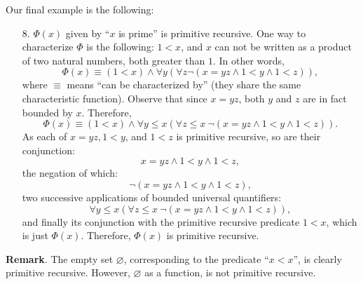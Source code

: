 \documentclass[12pt]{article}
\begin{document}
Our final example is the following:
\begin{enumerate}
\item[8.] $\Phi(x)$ given by ``$x$ is prime'' is primitive recursive.  One way to characterize $\Phi$ is the following: $1<x$, and $x$ can not be written as a product of two natural numbers, both greater than $1$.  In other words, $$\Phi(x) \equiv (1<x) \wedge \forall y (\forall z \neg (x=yz \wedge 1<y \wedge 1<z)),$$
where $\equiv$ means ``can be characterized by'' (they share the same characteristic function).  Observe that since $x=yz$, both $y$ and $z$ are in fact bounded by $x$.  Therefore, 
$$\Phi(x) \equiv (1<x) \wedge \forall y \le x(\forall z \le x \: \neg (x=yz \wedge 1<y \wedge 1<z)).$$
As each of $x=yz, 1<y$, and $1<z$ is primitive recursive, so are their conjunction: $$x=yz \wedge 1<y \wedge 1<z,$$ the negation of which: $$\neg (x=yz \wedge 1<y \wedge 1<z),$$ two successive applications of bounded universal quantifiers: $$\forall y \le x(\forall z \le x \: \neg (x=yz \wedge 1<y \wedge 1<z)),$$ and finally its conjunction with the primitive recursive predicate $1<x$, which is just $\Phi(x)$.  Therefore, $\Phi(x)$ is primitive recursive.
\end{enumerate}

\textbf{Remark}.  The empty set $\varnothing$, corresponding to the predicate ``$x < x$'', is clearly primitive recursive.  However, $\varnothing$ as a function, is not primitive recursive.
\end{document}
